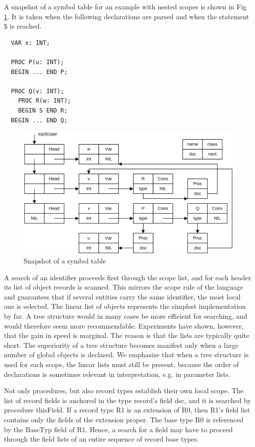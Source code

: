 A snapshot of a symbol table for an example with nested scopes is shown in Fig \ref{fig:symsnap}.
It is taken when the following declarations are parsed and when the statement \verb|S| is reached.
\begin{verbatim}
  VAR x: INT;
  
  PROC P(u: INT);
  BEGIN ... END P;
  
  PROC Q(v: INT);
    PROC R(w: INT);
    BEGIN S END R;
  BEGIN ... END Q;
\end{verbatim}

\begin{figure}[h!]
  \centering
  \includegraphics[width=\textwidth]{i/C/7.png}
  \caption{Snapshot of a symbol table}
  \label{fig:symsnap}
\end{figure}
A search of an identifier proceeds first through the scope list, and for each header its list of object
records is scanned. This mirrors the scope rule of the language and guarantees that if several
entities carry the same identifier, the most local one is selected. The linear list of objects represents
the simplest implementation by far. A tree structure would in many cases be more efficient for
searching, and would therefore seem more recommendable. Experiments have shown, however,
that the gain in speed is marginal. The reason is that the lists are typically quite short. The
superiority of a tree structure becomes manifest only when a large number of global objects is
declared. We emphasize that when a tree structure is used for each scope, the linear lists must still
be present, because the order of declarations is sometimes relevant in interpretation, e.g. in
parameter lists.

Not only procedures, but also record types establish their own local scope. The list of record fields
is anchored in the type record's field dsc, and it is searched by procedure thisField. If a record type
R1 is an extension of R0, then R1's field list contains only the fields of the extension proper. The
base type R0 is referenced by the BaseTyp field of R1. Hence, a search for a field may have to
proceed through the field lists of an entire sequence of record base types.

